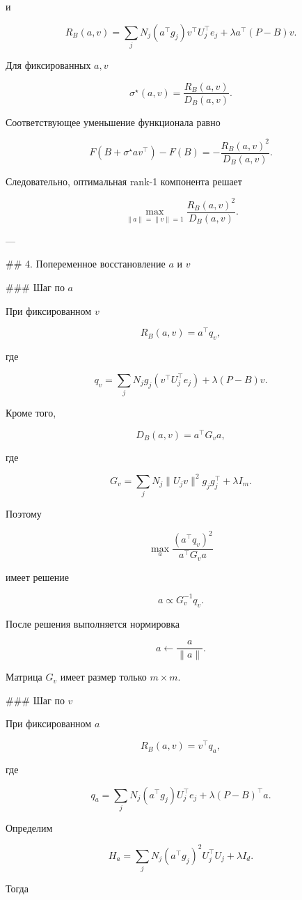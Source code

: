 и

\[
\boxed{
R_B(a,v)
=
\sum_j
N_j
(a^\top g_j)
v^\top U_j^\top e_j
+
\lambda a^\top(P-B)v.
}
\]

Для фиксированных \(a,v\)

\[
\boxed{
\sigma^\star(a,v)
=
\frac{R_B(a,v)}
     {D_B(a,v)}.
}
\]

Соответствующее уменьшение функционала равно

\[
\boxed{
F(B+\sigma^\star av^\top)-F(B)
=
-
\frac{R_B(a,v)^2}
     {D_B(a,v)}.
}
\]

Следовательно, оптимальная rank-1 компонента решает

\[
\boxed{
\max_{\|a\|=\|v\|=1}
\frac{R_B(a,v)^2}
     {D_B(a,v)}.
}
\]

---

## 4. Попеременное восстановление \(a\) и \(v\)

### Шаг по \(a\)

При фиксированном \(v\)

\[
R_B(a,v)=a^\top q_v,
\]

где

\[
q_v
=
\sum_j
N_j
g_j
\left(v^\top U_j^\top e_j\right)
+
\lambda(P-B)v.
\]

Кроме того,

\[
D_B(a,v)
=
a^\top G_v a,
\]

где

\[
\boxed{
G_v
=
\sum_j
N_j
\|U_jv\|^2
g_jg_j^\top
+
\lambda I_m.
}
\]

Поэтому

\[
\max_a
\frac{(a^\top q_v)^2}
     {a^\top G_va}
\]

имеет решение

\[
\boxed{
a
\propto
G_v^{-1}q_v.
}
\]

После решения выполняется нормировка

\[
a\leftarrow\frac{a}{\|a\|}.
\]

Матрица \(G_v\) имеет размер только \(m\times m\).

### Шаг по \(v\)

При фиксированном \(a\)

\[
R_B(a,v)=v^\top q_a,
\]

где

\[
q_a
=
\sum_j
N_j
(a^\top g_j)
U_j^\top e_j
+
\lambda(P-B)^\top a.
\]

Определим

\[
\boxed{
H_a
=
\sum_j
N_j
(a^\top g_j)^2
U_j^\top U_j
+
\lambda I_d.
}
\]

Тогда

